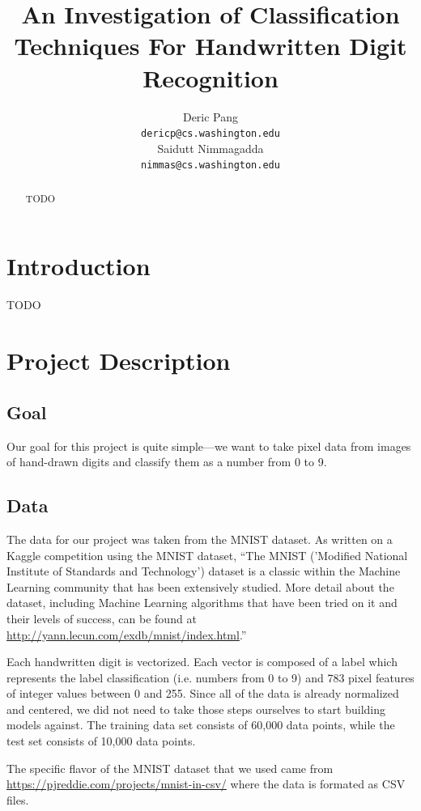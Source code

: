 ﻿\documentclass{article} %
\title{An Investigation of Classification Techniques For Handwritten Digit Recognition}
\author{
Deric Pang \\
\texttt{dericp@cs.washington.edu} \\
\And
Saidutt Nimmagadda \\
\texttt{nimmas@cs.washington.edu} \\
}
\begin{document}
\maketitle

\begin{abstract}
  TODO
\end{abstract}

\section{Introduction}
TODO

\section{Project Description}
\subsection{Goal}

Our goal for this project is quite simple---we want to
take pixel data from images of hand-drawn digits
and classify them as a number from 0 to 9.

\subsection{Data}

The data for our project was taken from the MNIST dataset. As written on a
Kaggle competition using the MNIST dataset, ``The MNIST
('Modified National Institute of Standards and Technology') dataset
is a classic within the Machine Learning community that has been extensively
studied. More detail about the dataset, including Machine Learning algorithms
that have been tried on it and their levels of success, can be found at
\href{http://yann.lecun.com/exdb/mnist/index.html}{http://yann.lecun.com/exdb/mnist/index.html}.''

Each handwritten digit is vectorized. Each vector is composed of a label which
represents the label classification (i.e. numbers from 0 to 9) and 783 pixel
features of integer values between 0 and 255. Since all
of the data is already normalized and centered, we did not need to take those
steps ourselves to start building models against. The training data set
consists of 60,000 data points, while the test set consists of 10,000 data
points.

The specific flavor of the MNIST dataset that we used came from
\href{https://pjreddie.com/projects/mnist-in-csv/}{https://pjreddie.com/projects/mnist-in-csv/}
where the data is formated as CSV files.
\end{document}
